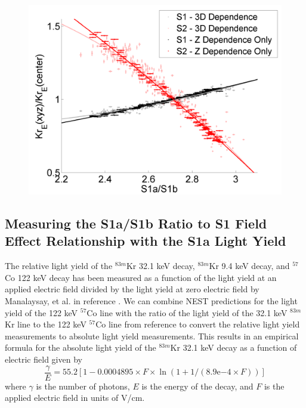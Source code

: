 \documentclass[a4paper,10pt,twocolumn]{article}
\begin{document}
\begin{figure}
\includegraphics[scale=0.4]{Run04Corrections/S1aS1bvField_ZDep_3D.png}
 \label{fig:S1FieldFig}
\end{figure}

\subsection{Measuring the S1a/S1b Ratio to S1 Field Effect Relationship with the S1a Light Yield} \label{MatthewsIdea}

The relative light yield of the $^{83m}$Kr 32.1 keV decay, $^{83m}$Kr 9.4 keV decay, and $^{57}$Co 122 keV decay has been measured as a function of the light yield at an applied electric field divided by the light yield at zero electric field by Manalaysay, et al. in reference \cite{Manalaysay}.  We can combine NEST predictions for the light yield of the 122 keV $^{57}$Co line with the ratio of the light yield of the 32.1 keV $^{83m}$Kr line to the 122 keV $^{57}$Co line from reference \cite{Manalaysay} to convert the relative light yield measurements to absolute light yield measurements.  This results in an empirical formula for the absolute light yield of the $^{83m}$Kr 32.1 keV decay as a function of electric field given by
\begin{equation}
\frac{\gamma}{E} = 55.2[1-0.0004895 \times F \times \ln{(1 + 1/(8.9\mathrm{e}{-4} \times F))}]
\label{S1aYield}
\end{equation}
where $\gamma$ is the number of photons, $E$ is the energy of the decay, and $F$ is the applied electric field in units of V/cm.  
\end{document}
